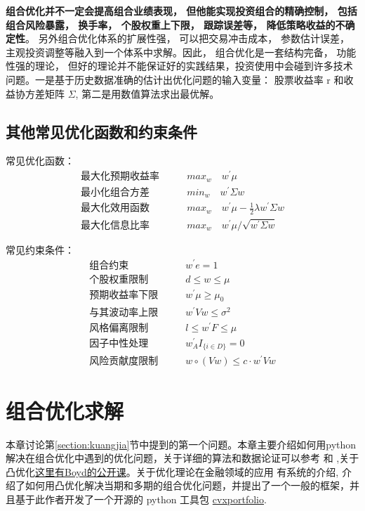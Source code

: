\documentclass[UTF8,11pt]{ctexart}
\begin{document}
\textbf{组合优化并不一定会提高组合业绩表现， 但他能实现投资组合的精确控制， 包括组合风险暴露， 换手率， 个股权重上下限， 跟踪误差等， 降低策略收益的不确定性}。 另外组合优化体系的扩展性强， 可以把交易冲击成本， 参数估计误差， 主观投资调整等融入到一个体系中求解。因此， 组合优化是一套结构完备， 功能性强的理论， 但好的理论并不能保证好的实践结果，投资使用中会碰到许多技术问题。一是基于历史数据准确的估计出优化问题的输入变量： 股票收益率 r 和收益协方差矩阵 $\Sigma$, 第二是用数值算法求出最优解。
\subsection{其他常见优化函数和约束条件}

常见优化函数：
\begin{align}
\mbox{最大化预期收益率}\qquad & max_w \quad w^\prime \mu\\
\mbox{最小化组合方差}\qquad  & min_w \quad w^\prime \Sigma w\\
\mbox{最大化效用函数}\qquad  & max_w\quad w^\prime\mu -\frac{1}{2}\lambda w^\prime \Sigma w\\
\mbox{最大化信息比率}\qquad & max_w\quad w^\prime\mu/\sqrt{w^\prime \Sigma w}
\end{align}

常见约束条件：
\begin{align}
\mbox{组合约束}\qquad & w^\prime e=1\\
\mbox{个股权重限制}\qquad & d\le w\le \mu\\
\mbox{预期收益率下限}\qquad & w^\prime \mu \ge \mu_0 \\
\mbox{与其波动率上限}\qquad & w^\prime V w \le \sigma^2\\
\mbox{风格偏离限制} \qquad & l\le w^\prime F \le \mu\\
\mbox{因子中性处理} \qquad & w_A^\prime I_{\{i \in D\}}=0\\
\mbox{风险贡献度限制} \qquad & w\circ(V w)\le c\cdot w^\prime V w
\end{align}

\section{组合优化求解}
本章讨论第\ref{section:kuangjia}节中提到的第一个问题。本章主要介绍如何用python解决在组合优化中遇到的优化问题，关于详细的算法和数据论证可以参考 和 ,关于凸优化\href{https://web.stanford.edu/~boyd/cvxbook/}{这里有Boyd的公开课}。关于优化理论在金融领域的应用  有系统的介绍,  介绍了如何用凸优化解决当期和多期的组合优化问题，并提出了一个一般的框架，并且基于此作者开发了一个开源的 python 工具包 \href{http://cvxportfolio.org/}{cvxportfolio}.
\end{document}
